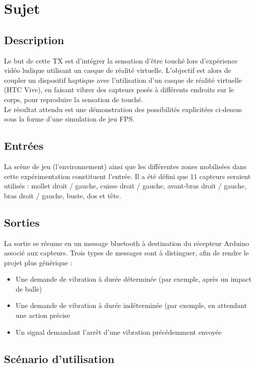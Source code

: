 \chapter{Sujet} 
\label{ch:sujet}

\section{Description}

Le but de cette TX est d'intégrer la sensation d’être touché lors d’expérience vidéo ludique utilisant un casque de réalité virtuelle. L'objectif est alors de coupler un dispositif haptique avec l'utilisation d'un casque de réalité virtuelle (HTC Vive), en faisant vibrer des capteurs posés à différents endroits sur le corps, pour reproduire la sensation de touché. \\
Le résultat attendu est une démonstration des possibilités explicitées ci-dessus sous la forme d'une simulation de jeu FPS.

\section{Entrées}

La scène de jeu (l'environnement) ainsi que les différentes zones mobilisées dans cette expérimentation constituent l'entrée. Il a été défini que 11 capteurs seraient utilisés : mollet droit / gauche, cuisse droit / gauche, avant-bras droit / gauche, bras droit / gauche, buste, dos et tête.

\section{Sorties}

La sortie se résume en un message bluetooth à destination du récepteur Arduino associé aux capteurs. Trois types de messages sont à distinguer, afin de rendre le projet plus générique : 
\begin{itemize}
	\item Une demande de vibration à durée déterminée (par exemple, après un impact de balle)
	\item Une demande de vibration à durée indéterminée (par exemple, en attendant une action précise
	\item Un signal demandant l'arrêt d'une vibration précédemment envoyée
\end{itemize}

\section{Scénario d'utilisation}

